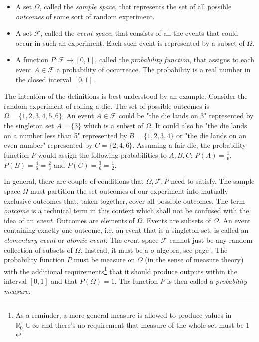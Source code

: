 \begin{itemize}

\item 
A set $\Omega$, called the \emph{sample space}, that represents the set of all possible \emph{outcomes} of some sort of random experiment.

\item
A set $\mathcal{F}$, called the \emph{event space}, that consists of all the events that could occur in such an experiment. Each such event is represented by a subset of $\Omega$.

\item 
A function $P: \mathcal{F} \rightarrow [0,1]$, called the \emph{probability function}, that assigns to each event $A \in \mathcal{F}$ a probability of occurrence. The probability is a real number in the closed interval $[0,1]$.

\end{itemize}


The intention of the definitions is best understood by an example. Consider the random experiment of rolling a die. The set of possible outcomes is $\Omega = \{1,2,3,4,5,6\}$. An event $A \in \mathcal{F}$ could be "the die lands on 3" represented by the singleton set $A = \{3\}$ which is a subset of $\Omega$. It could also be "the die lands on a number less than 5" represented by $B = \{1,2,3,4\}$ or "the die lands on an even number" represented by $C = \{2,4,6\}$. Assuming a fair die, the probability function $P$ would assign the following probabilities to $A,B,C$: $P(A) = \frac{1}{6}$, $P(B) = \frac{4}{6} = \frac{2}{3}$ and  $P(C) = \frac{3}{6} = \frac{1}{2}$.

\medskip
In general, there are couple of conditions that $\Omega, \mathcal{F}, P$ need to satisfy. The sample space $\Omega$ must partition the set outcomes of our experiment into mutually exclusive outcomes that, taken together, cover all possible outcomes. The term \emph{outcome} is a technical term in this context which shall not be confused with the idea of an \emph{event}. Outcomes are elements of $\Omega$. Events are subsets of $\Omega$. An event containing exactly one outcome, i.e. an event that is a singleton set, is called an \emph{elementary event} or \emph{atomic event}. The event space $\mathcal{F}$ cannot just be any random collection of subsets of $\Omega$. Instead, it must be a $\sigma$-algebra, see page \pageref{Def:SigmaAlgebra}. The probability function $P$ must be measure on $\Omega$ (in the sense of measure theory) with the additional requirements\footnote{As a reminder, a more general measure is allowed to produce values in $\mathbb{R}^+_0 \cup \infty$ and there's no requirement that measure of the whole set must be $1$} that it should produce outputs within the interval $[0,1]$ and that $P(\Omega) = 1$. The function $P$ is then called a \emph{probability measure}.

